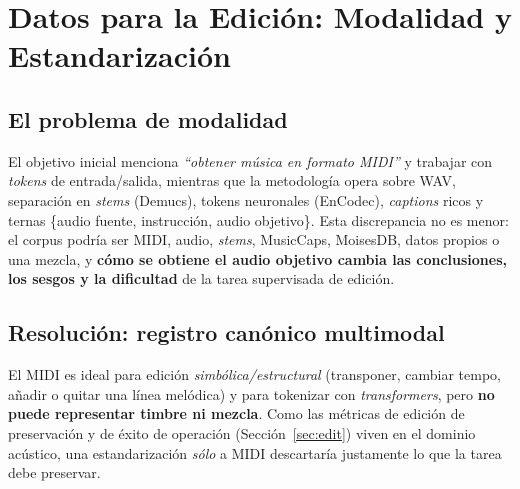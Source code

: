 
\section{Datos para la Edición: Modalidad y Estandarización}
\label{sec:edit:data}

\subsection{El problema de modalidad}
\label{sec:edit:data:modalidad}

El objetivo inicial menciona \emph{``obtener música en formato MIDI''} y trabajar
con \emph{tokens} de entrada/salida, mientras que la metodología opera sobre WAV,
separación en \textit{stems} (Demucs), tokens neuronales (EnCodec),
\textit{captions} ricos y ternas \{audio fuente, instrucción, audio objetivo\}.
Esta discrepancia no es menor: el corpus podría ser MIDI, audio, \textit{stems},
MusicCaps, MoisesDB, datos propios o una mezcla, y \textbf{cómo se obtiene el
audio objetivo cambia las conclusiones, los sesgos y la dificultad} de la tarea
supervisada de edición.

\subsection{Resolución: registro canónico multimodal}
\label{sec:edit:data:canonico}

El MIDI es ideal para edición \emph{simbólica/estructural} (transponer, cambiar
tempo, añadir o quitar una línea melódica) y para tokenizar con
\textit{transformers}, pero \textbf{no puede representar timbre ni mezcla}.
Como las métricas de edición de preservación y de éxito de operación
(Sección~\ref{sec:edit}) viven en el dominio acústico, una estandarización
\emph{sólo} a MIDI descartaría justamente lo que la tarea debe preservar.

